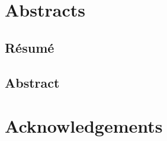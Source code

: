 \documentclass{these-dbl}
\begin{document}



\frontmatter
\renewcommand{\thepage}{\roman{page}}%

\clearemptydoublepage
\chapter*{Abstracts\label{chap:abstracts}}

\section*{Résumé}

\newpage
{}
\section*{Abstract}



\clearemptydoublepage
\chapter*{Acknowledgements\label{chap:ack}}


\end{document}
